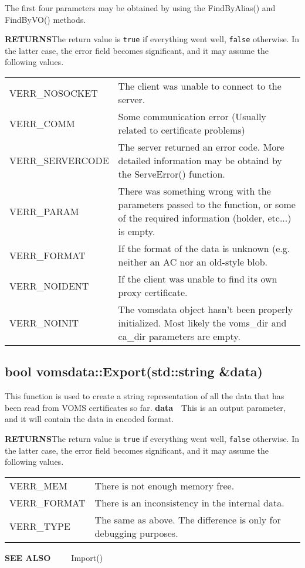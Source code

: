 \documentclass[a4paper]{book}
\newcommand{\also}[1]{\textbf{SEE ALSO}\newline\ \ \ \ \ #1}
\newcommand{\return}{\textbf{RETURNS}\newline}
\newcommand{\parameter}[2]{\newline\textbf{#1}\ \ #2}
\begin{document}
The first four parameters may be obtained by using the FindByAlias() and
FindByVO() methods.

\return The return value is \texttt{true} if everything went well,
\texttt{false} otherwise.  In the latter case, the error field becomes
significant, and it may assume the following values.


\bigskip\begin{tabular}{lp{3in}}
VERR\_NOSOCKET & The client was unable to connect to the server.\\
VERR\_COMM    & Some communication error (Usually related to
certificate problems)\\
VERR\_SERVERCODE & The server returned an error code.  More detailed
information may be obtaind by the ServeError() function.\\
VERR\_PARAM   & There was something wrong with the parameters passed to
the function, or some of the required information (holder, etc...) is
empty.\\ 
VERR\_FORMAT  & If the format of the data is unknown (e.g. neither an
AC nor an old-style blob.\\
VERR\_NOIDENT & If the client was unable to find its own proxy certificate.\\ 
VERR\_NOINIT  & The vomsdata object hasn't been properly initialized.
Most likely the voms\_dir and ca\_dir parameters are empty.\\
\end{tabular}

\subsection{bool vomsdata::Export(std::string \&data)}

This function is used to create a string representation of all the
data that has been read from VOMS certificates so far.
\parameter{data}{This is an output parameter, and it will contain the data in encoded format.}

\return The return value is \texttt{true} if everything went well,
\texttt{false} otherwise.  In the latter case, the error field becomes
significant, and it may assume the following values.


\bigskip\begin{tabular}{lp{3in}}
VERR\_MEM    & There is not enough memory free.\\
VERR\_FORMAT & There is an inconsistency in the internal data.\\
VERR\_TYPE   & The same as above.  The difference is only for debugging
purposes.\\
\end{tabular}
\also{Import()}
\end{document}

